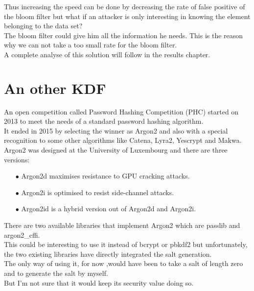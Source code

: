 \documentclass{eplmastersthesis}
\begin{document}
Thus increasing the speed can be done by decreasing the rate of false positive of the bloom filter but what if an attacker is only interesting in knowing the element belonging to the data set?\\
The bloom filter could give him all the information he needs. This is the reason why we can not take a too small rate for the bloom filter.\\

A complete analyse of this solution will follow in the results chapter.


\section{An other KDF}
An open competition called Password Hashing Competition (PHC) started on 2013 to meet the needs of a standard password hashing algorithm.\\ 
It ended in 2015 by selecting the winner as Argon2 and also with a special recognition to some other algorithms like Catena, Lyra2, Yescrypt and Makwa.\\
Argon2 was designed at the University of Luxembourg and there are three versions:
\begin{itemize}
\item[$\bullet$] Argon2d maximises resistance to GPU cracking attacks.
\item[$\bullet$] Argon2i is optimised to resist side-channel attacks.
\item[$\bullet$] Argon2id is a hybrid version out of Argon2d and Argon2i.
\end{itemize}

There are two available libraries that implement Argon2 which are passlib and argon2\_cffi.\\
This could be interesting to use it instead of bcrypt or pbkdf2 but unfortunately, the two existing libraries have directly integrated the salt generation. \\
The only way of using it, for now ,would have been to take a salt of length zero and to generate the salt by myself. \\
But I'm not sure that it would keep its security value doing so.
\end{document}
